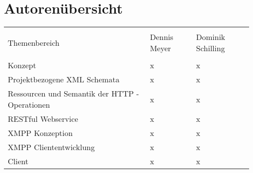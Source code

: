 
\chapter{Autorenübersicht}

\begin{table}[H]

\centering
\begin{tabular}{l l l}
\\ [-0.5ex]
\hline\hline
\\ [-0.5ex]
Themenbereich & Dennis Meyer & Dominik Schilling
\\ [1.5ex]
\hline
\\ [-0.5ex]
Konzept & x & x  \\[1ex]
Projektbezogene XML Schemata & x & x \\[1ex]
Ressourcen und Semantik der HTTP - Operationen & x & x \\[1ex]
RESTful Webservice & x & x \\[1ex]
XMPP Konzeption & x & x\\[1ex]
XMPP Cliententwicklung & x & x\\[1ex]
Client & x & x \\[1ex]
\hline
\end{tabular}
\label{tab:ressourcendesserientrackers}
\end{table}
